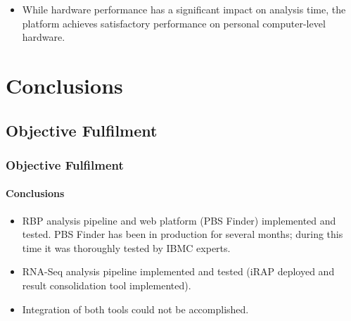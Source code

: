 \documentclass[xcolor=dvipsnames]{beamer}
\begin{document}
\begin{frame}[allowframebreaks]
\begin{itemize}
\item
While hardware performance has a significant impact on analysis time, the
platform achieves satisfactory performance on personal computer-level hardware.
\end{itemize}




\end{frame}


\section{Conclusions}
\subsection{Objective Fulfilment}
\begin{frame}
  \frametitle{Objective Fulfilment}
  \framesubtitle{Conclusions}

\begin{itemize}
\item
RBP analysis pipeline and web platform (PBS Finder) implemented and tested. PBS
Finder has been in production for several months; during this time it was
thoroughly tested by IBMC experts.\\ \vspace{0.8cm}

\item
RNA-Seq analysis pipeline implemented and tested (iRAP deployed and result
consolidation tool implemented).\\ \vspace{0.8cm}

\item
Integration of both tools could not be accomplished.
\end{itemize}


\end{frame}
\end{document}

